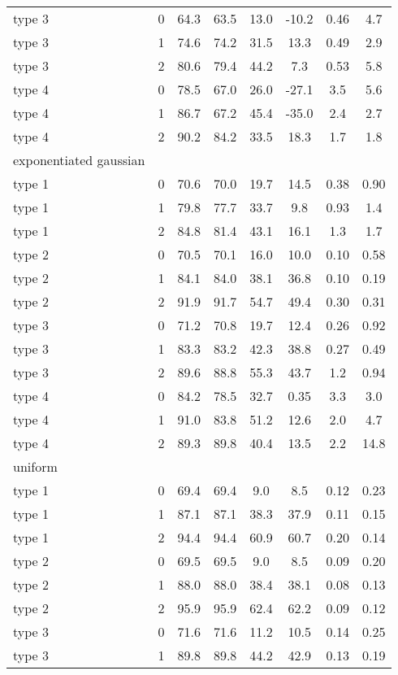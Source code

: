 \documentclass[
]{article}
\begin{document}
\begin{longtable}{lccccccc}
type 3 & 0 & 64.3 & 63.5 & 13.0 & -10.2 & 0.46 & 4.7 \\ 
type 3 & 1 & 74.6 & 74.2 & 31.5 & 13.3 & 0.49 & 2.9 \\ 
type 3 & 2 & 80.6 & 79.4 & 44.2 & 7.3 & 0.53 & 5.8 \\ 
type 4 & 0 & 78.5 & 67.0 & 26.0 & -27.1 & 3.5 & 5.6 \\ 
type 4 & 1 & 86.7 & 67.2 & 45.4 & -35.0 & 2.4 & 2.7 \\ 
type 4 & 2 & 90.2 & 84.2 & 33.5 & 18.3 & 1.7 & 1.8 \\ 
\midrule
\multicolumn{1}{l}{exponentiated gaussian} \\ 
\midrule
type 1 & 0 & 70.6 & 70.0 & 19.7 & 14.5 & 0.38 & 0.90 \\ 
type 1 & 1 & 79.8 & 77.7 & 33.7 & 9.8 & 0.93 & 1.4 \\ 
type 1 & 2 & 84.8 & 81.4 & 43.1 & 16.1 & 1.3 & 1.7 \\ 
type 2 & 0 & 70.5 & 70.1 & 16.0 & 10.0 & 0.10 & 0.58 \\ 
type 2 & 1 & 84.1 & 84.0 & 38.1 & 36.8 & 0.10 & 0.19 \\ 
type 2 & 2 & 91.9 & 91.7 & 54.7 & 49.4 & 0.30 & 0.31 \\ 
type 3 & 0 & 71.2 & 70.8 & 19.7 & 12.4 & 0.26 & 0.92 \\ 
type 3 & 1 & 83.3 & 83.2 & 42.3 & 38.8 & 0.27 & 0.49 \\ 
type 3 & 2 & 89.6 & 88.8 & 55.3 & 43.7 & 1.2 & 0.94 \\ 
type 4 & 0 & 84.2 & 78.5 & 32.7 & 0.35 & 3.3 & 3.0 \\ 
type 4 & 1 & 91.0 & 83.8 & 51.2 & 12.6 & 2.0 & 4.7 \\ 
type 4 & 2 & 89.3 & 89.8 & 40.4 & 13.5 & 2.2 & 14.8 \\ 
\midrule
\multicolumn{1}{l}{uniform} \\ 
\midrule
type 1 & 0 & 69.4 & 69.4 & 9.0 & 8.5 & 0.12 & 0.23 \\ 
type 1 & 1 & 87.1 & 87.1 & 38.3 & 37.9 & 0.11 & 0.15 \\ 
type 1 & 2 & 94.4 & 94.4 & 60.9 & 60.7 & 0.20 & 0.14 \\ 
type 2 & 0 & 69.5 & 69.5 & 9.0 & 8.5 & 0.09 & 0.20 \\ 
type 2 & 1 & 88.0 & 88.0 & 38.4 & 38.1 & 0.08 & 0.13 \\ 
type 2 & 2 & 95.9 & 95.9 & 62.4 & 62.2 & 0.09 & 0.12 \\ 
type 3 & 0 & 71.6 & 71.6 & 11.2 & 10.5 & 0.14 & 0.25 \\ 
type 3 & 1 & 89.8 & 89.8 & 44.2 & 42.9 & 0.13 & 0.19 \\ 

\end{longtable}
\end{document}
